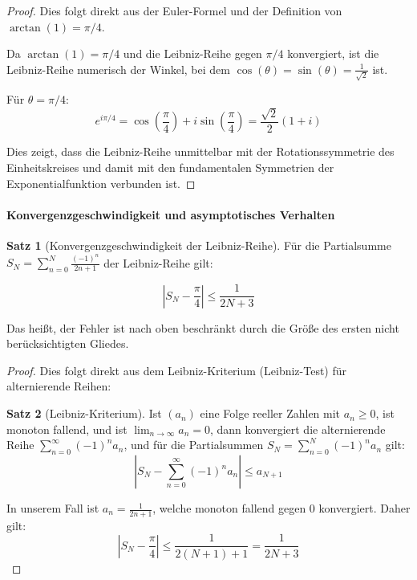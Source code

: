 \documentclass[a4paper, 12pt, twoside, openright]{report}
\theoremstyle{definition}
\theoremstyle{definition}
\newtheorem{satz}{Satz}[chapter]
\begin{document}
\begin{proof}
Dies folgt direkt aus der Euler-Formel und der Definition von $\arctan(1) = \pi/4$.

Da $\arctan(1) = \pi/4$ und die Leibniz-Reihe gegen $\pi/4$ konvergiert, ist die Leibniz-Reihe numerisch der Winkel, bei dem $\cos(\theta) = \sin(\theta) = \frac{1}{\sqrt{2}}$ ist.

Für $\theta = \pi/4$:
\begin{equation}
e^{i\pi/4} = \cos\left(\frac{\pi}{4}\right) + i\sin\left(\frac{\pi}{4}\right) = \frac{\sqrt{2}}{2} \left(1 + i\right)
\end{equation}

Dies zeigt, dass die Leibniz-Reihe unmittelbar mit der Rotationssymmetrie des Einheitskreises und damit mit den fundamentalen Symmetrien der Exponentialfunktion verbunden ist.
\end{proof}

\paragraph{Konvergenzgeschwindigkeit und asymptotisches Verhalten}

\begin{satz}[Konvergenzgeschwindigkeit der Leibniz-Reihe]
Für die Partialsumme $S_N = \sum_{n=0}^{N} \frac{(-1)^n}{2n+1}$ der Leibniz-Reihe gilt:

\begin{equation}
\left|S_N - \frac{\pi}{4}\right| \leq \frac{1}{2N+3}
\end{equation}

Das heißt, der Fehler ist nach oben beschränkt durch die Größe des ersten nicht berücksichtigten Gliedes.
\end{satz}

\begin{proof}
Dies folgt direkt aus dem Leibniz-Kriterium (Leibniz-Test) für alternierende Reihen:

\begin{satz}[Leibniz-Kriterium]
Ist $(a_n)$ eine Folge reeller Zahlen mit $a_n \geq 0$, ist monoton fallend, und ist $\lim_{n \to \infty} a_n = 0$, dann konvergiert die alternierende Reihe $\sum_{n=0}^{\infty} (-1)^n a_n$, und für die Partialsummen $S_N = \sum_{n=0}^{N} (-1)^n a_n$ gilt:
\begin{equation}
|S_N - \sum_{n=0}^{\infty} (-1)^n a_n| \leq a_{N+1}
\end{equation}
\end{satz}

In unserem Fall ist $a_n = \frac{1}{2n+1}$, welche monoton fallend gegen 0 konvergiert. Daher gilt:
\begin{equation}
\left|S_N - \frac{\pi}{4}\right| \leq \frac{1}{2(N+1)+1} = \frac{1}{2N+3}
\end{equation}
\end{proof}
\end{document}
